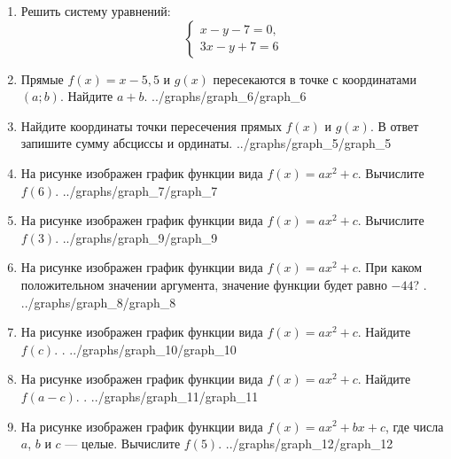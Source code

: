 \documentclass[12pt, a4paper]{article}
\begin{document}
	  
	\begin{enumerate}
		\item Решить систему уравнений:
		$$\left\{
		\begin{array}{l}
			x-y-7=0,\\
			3x-y+7=6
		\end{array}
		\right.$$ 
		\item \funcexer
		{Прямые $f(x)=x-5,5$ и $g(x)$ пересекаются в точке с координатами $(a;b)$. Найдите $a+b$. }
		{../graphs/graph_6/graph_6}
		\item \funcexer
		{Найдите координаты точки пересечения прямых $f(x)$ и $g(x)$. В ответ запишите сумму абсциссы и ординаты. }
		{../graphs/graph_5/graph_5}
		\item \funcexer
		{На рисунке изображен график функции вида $f(x)=ax^2+c$. Вычислите $f(6)$. }
		{../graphs/graph_7/graph_7}
		\item \funcexer
		{На рисунке изображен график функции вида $f(x)=ax^2+c$. Вычислите $f(3)$. }
		{../graphs/graph_9/graph_9}
		\item \funcexer
		{На рисунке изображен график функции вида $f(x)=ax^2+c$. При каком положительном значении аргумента, значение функции будет равно $-44$? .}
		{../graphs/graph_8/graph_8}
		\item \funcexer
		{На рисунке изображен график функции вида $f(x)=ax^2+c$. Найдите $f(c)$. .}
		{../graphs/graph_10/graph_10}
		\item \funcexer
		{На рисунке изображен график функции вида $f(x)=ax^2+c$. Найдите $f(a-c)$. .}
		{../graphs/graph_11/graph_11}
		\item \funcexer
		{На рисунке изображен график функции вида $f(x)=ax^2+bx+c$, где числа $a$, $b$ и $c$ — целые. Вычислите $f(5)$. }
		{../graphs/graph_12/graph_12}
	\end{enumerate}
\end{document}
